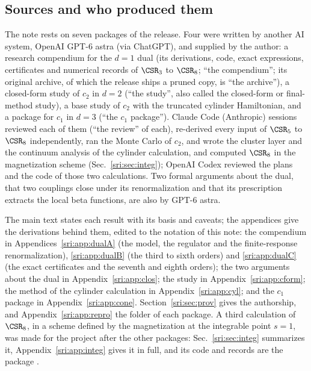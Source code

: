 \subsection{Sources and who produced them}\label{sri:sec:sources}
The note rests on seven packages of the release. Four were written by another AI system, OpenAI GPT-6 astra (via
ChatGPT), and supplied by the author: a research compendium for the $d=1$ dual (its derivations, code, exact
expressions, certificates and numerical records of $\CSR_3$ to $\CSR_8$; ``the compendium''; its original
archive, of which the release ships a pruned copy, is ``the archive''), a closed-form study of $c_2$ in $d=2$ (``the
study'', also called the closed-form or final-method study), a base study of $c_2$ with the truncated cylinder Hamiltonian, and a package for $c_1$
in $d=3$ (``the $c_1$ package''). Claude Code (Anthropic) sessions reviewed each of them (``the review'' of each),
re-derived every input of $\CSR_5$ to $\CSR_8$ independently, ran the Monte Carlo of $c_2$, and wrote the cluster
layer and the continuum analysis of the cylinder calculation, and computed $\CSR_8$ in the magnetization scheme
(Sec.~\ref{sri:sec:integ}); OpenAI Codex reviewed the plans and the code of those two calculations. Two formal arguments about the dual, that two couplings close under its renormalization and that its
prescription extracts the local beta functions, are also by GPT-6 astra.

The main text states each result with its basis and caveats; the appendices give the derivations behind them, edited
to the notation of this note: the compendium in Appendices~\ref{sri:app:dualA} (the model, the regulator and the
finite-response renormalization), \ref{sri:app:dualB} (the third to sixth orders) and \ref{sri:app:dualC} (the exact
certificates and the seventh and eighth orders); the two arguments about the dual in Appendix~\ref{sri:app:clos}; the
study in Appendix~\ref{sri:app:cform}; the method of the cylinder calculation in Appendix~\ref{sri:app:cyl}; and the $c_1$
package in Appendix~\ref{sri:app:cone}. Section~\ref{sri:sec:prov} gives the authorship, and Appendix~\ref{sri:app:repro} the
folder of each package. A third calculation of $\CSR_8$, in a scheme defined by the magnetization at the integrable
point $s=1$, was made for the project after the other packages: Sec.~\ref{sri:sec:integ} summarizes it,
Appendix~\ref{sri:app:integ} gives it in full, and its code and records are the package .

